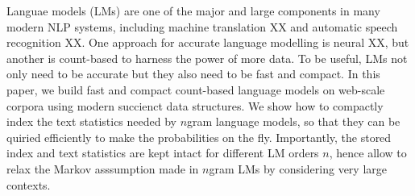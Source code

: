 %
Languae models (LMs) are one of the major and large components in many modern NLP systems, including machine translation XX and automatic speech recognition XX.
%
One approach for accurate language modelling is neural XX, but another is  count-based to harness the power of more data.
%
To be useful, LMs not only need to be accurate but they also need to be fast and compact.
%
In this paper, we build  fast and compact count-based language models on web-scale corpora using modern succienct data structures.
%  
We show how to compactly index the text statistics needed by $n$gram language models, so that they can be quiried efficiently to make the probabilities on the fly. 
%
Importantly, the stored index and text statistics are kept intact for different LM orders $n$, hence allow to relax the 
Markov asssumption made in $n$gram LMs by considering very large contexts. 


  
%
 






